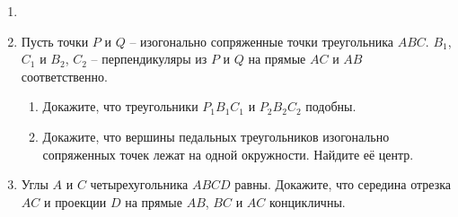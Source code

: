 \begin{enumerate}[resume*]
\begin{enumerate}
    \end{enumerate}

    \item {} \wishlisted

    \item Пусть точки $P$ и $Q$ -- изогонально сопряженные точки треугольника $ABC$. $B_1$, $C_1$ и $B_2$, $C_2$ -- перпендикуляры из $P$ и $Q$ на прямые $AC$ и $AB$ соответственно. \begin{enumerate}
        \item Докажите, что треугольники $P_1B_1C_1$ и $P_2B_2C_2$ подобны.
        \item Докажите, что вершины педальных треугольников изогонально сопряженных точек лежат на одной окружности. Найдите её центр. \wishlisted
    \end{enumerate}
    
    \item Углы $A$ и $C$ четырехугольника $ABCD$ равны. Докажите, что середина отрезка $AC$ и проекции $D$ на прямые $AB$, $BC$ и $AC$ концикличны.
\end{enumerate}
